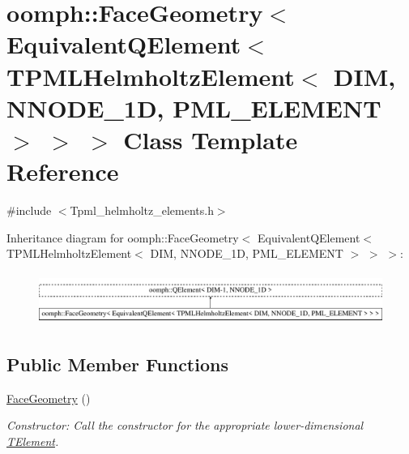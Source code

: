 \hypertarget{classoomph_1_1FaceGeometry_3_01EquivalentQElement_3_01TPMLHelmholtzElement_3_01DIM_00_01NNODE__1d6a940810257b7d5eb8bc5fb172f4662}{}\section{oomph\+:\+:Face\+Geometry$<$ Equivalent\+Q\+Element$<$ T\+P\+M\+L\+Helmholtz\+Element$<$ D\+IM, N\+N\+O\+D\+E\+\_\+1D, P\+M\+L\+\_\+\+E\+L\+E\+M\+E\+NT $>$ $>$ $>$ Class Template Reference}
\label{classoomph_1_1FaceGeometry_3_01EquivalentQElement_3_01TPMLHelmholtzElement_3_01DIM_00_01NNODE__1d6a940810257b7d5eb8bc5fb172f4662}


{\ttfamily \#include $<$Tpml\+\_\+helmholtz\+\_\+elements.\+h$>$}

Inheritance diagram for oomph\+:\+:Face\+Geometry$<$ Equivalent\+Q\+Element$<$ T\+P\+M\+L\+Helmholtz\+Element$<$ D\+IM, N\+N\+O\+D\+E\+\_\+1D, P\+M\+L\+\_\+\+E\+L\+E\+M\+E\+NT $>$ $>$ $>$\+:\begin{figure}[H]
\begin{center}
\leavevmode
\includegraphics[height=1.694402cm]{classoomph_1_1FaceGeometry_3_01EquivalentQElement_3_01TPMLHelmholtzElement_3_01DIM_00_01NNODE__1d6a940810257b7d5eb8bc5fb172f4662}
\end{center}
\end{figure}
\subsection*{Public Member Functions}
\begin{DoxyCompactItemize}
\item 
\hyperlink{classoomph_1_1FaceGeometry_3_01EquivalentQElement_3_01TPMLHelmholtzElement_3_01DIM_00_01NNODE__1d6a940810257b7d5eb8bc5fb172f4662_aa0a7d5c4e62208541b00c05d118b6ffd}{Face\+Geometry} ()
\begin{DoxyCompactList}\small\item\em Constructor\+: Call the constructor for the appropriate lower-\/dimensional \hyperlink{classoomph_1_1TElement}{T\+Element}. \end{DoxyCompactList}\end{DoxyCompactItemize}


